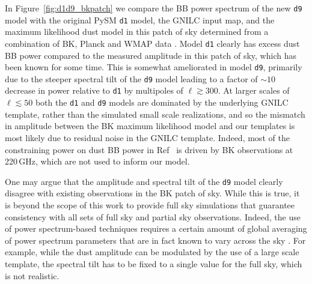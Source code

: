 \documentclass[twocolumn]{aastex631}
\newcommand{\done}{{\tt d1}}
\newcommand{\dnine}{{\tt d9}}
\begin{document}
In Figure~\ref{fig:d1d9_bkpatch} we compare the BB power spectrum of the new \dnine{} model with the original PySM \done{} model, the GNILC input map, and the maximum likelihood dust model in this patch of sky determined from a combination of BK, Planck and WMAP data \citep{Ade:2021}. Model \done{} clearly has excess dust BB power compared to the measured amplitude in this patch of sky, which has been known for some time. This is somewhat ameliorated in model \dnine{}, primarily due to the steeper spectral tilt of the \dnine{} model leading to a factor of $\sim 10$ decrease in power relative to \done{} by multipoles of $\ell \gtrsim 300$. At larger scales of $\ell \lesssim 50$ both the \done{} and \dnine{} models are dominated by the underlying GNILC template, rather than the simulated small scale realizations, and so the mismatch in amplitude between the BK maximum likelihood model and our templates is most likely due to residual noise in the GNILC template. Indeed, most of the constraining power on dust BB power in Ref~\cite{Ade:2021} is driven by BK observations at 220\,GHz, which are not used to inform our model. 

One may argue that the amplitude and spectral tilt of the \dnine{} model clearly disagree with existing observations in the BK patch of sky. While this is true, it is beyond the scope of this work to provide full sky simulations that guarantee consistency with all sets of full sky and partial sky observations. Indeed, the use of power spectrum-based techniques requires a certain amount of global averaging of power spectrum parameters that are in fact known to vary across the sky \cite{planck2016-l04}. For example, while the dust amplitude can be modulated by the use of a large scale template, the spectral tilt has to be fixed to a single value for the full sky, which is not realistic. 
\end{document}
